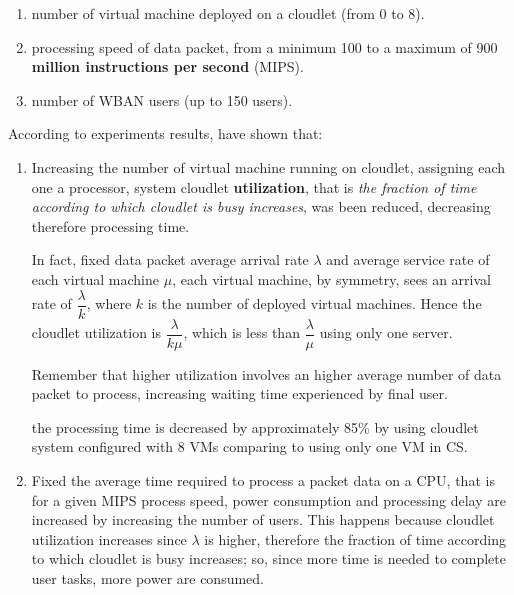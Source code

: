 \documentclass[sigchi]{acmart}
\begin{document}
\begin{enumerate}
\item number of virtual machine deployed on a cloudlet (from 0 to 8).
\item processing speed of data packet, from a minimum 100 to a maximum of 900 \textbf{million instructions per second} (MIPS).
\item number of WBAN users (up to 150 users).
\end{enumerate}

According to experiments results, \cite{MSAReport} have shown that:

\begin{enumerate}

\item Increasing the number of virtual machine running on cloudlet, assigning each one a processor, system cloudlet \textbf{utilization}, that is \textit{the fraction of time according to which cloudlet is busy increases}, was been reduced, decreasing therefore processing time.

In fact, fixed data packet average arrival rate $\lambda$ and average service rate of each virtual machine $\mu$, each virtual machine, by symmetry, sees an arrival rate of $\dfrac{\lambda}{k}$, where $k$ is the number of deployed virtual machines. Hence the cloudlet utilization is $\dfrac{\lambda}{k\mu}$, which is less than $\dfrac{\lambda}{\mu}$ using only one server.  

Remember that higher utilization involves an higher average number of data packet to process, increasing waiting time experienced by final user.

\vspace{0.3cm}

\begin{quoting}[font=itshape, begintext={``}, endtext={''\cite[par.~3.3]{MSAReport}}]
the processing time is decreased by approximately 85\% by using cloudlet system configured with 8 VMs comparing to using only one VM in CS.
\end{quoting}

\vspace{0.3cm}

\item Fixed the average time required to process a packet data on a CPU, that is for a given MIPS process speed, power consumption and processing delay are increased by increasing the number of users. This happens because cloudlet utilization increases since $\lambda$ is higher, therefore the fraction of time according to which cloudlet is busy increases; so, since more time is needed to complete user tasks, more power are consumed.

\end{enumerate}
\end{document}
